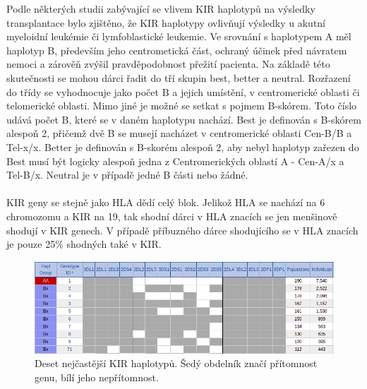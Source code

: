 \documentclass[czech,DP]{thesiskiv}
\numberwithin{equation}{section}
\begin{document}
\noindent
Podle některých studii zabývající se vlivem KIR haplotypů na výsledky transplantace bylo zjištěno, že KIR haplotypy ovlivňují výsledky u akutní myeloidní leukémie či  lymfoblastické leukemie. Ve srovnání s haplotypem A měl haplotyp B, především jeho centrometická část, ochraný účinek před návratem nemoci a zárověň zvýšil pravděpodobnost přežití pacienta. Na základě této skutečnosti se mohou dárci řadit do tří skupin best, better a neutral. Rozřazení do třídy se vyhodnocuje jako počet B a jejich umístění, v centromerické oblasti či telomerické oblasti. Mimo jiné je možné se setkat s pojmem B-skórem. Toto číslo udává počet B, které se v daném haplotypu nachází. Best je definován s B-skórem alespoň 2, přičemž dvě B se musejí nacházet v centromerické oblasti Cen-B/B a Tel-x/x. Better je definován s B-skorém alespoň 2, aby nebyl haplotyp zařezen do Best musí být logicky alespoň jedna z Centromerických oblastí A - Cen-A/x a Tel-B/x. Neutral je v případě jedné B části nebo žádné. \cite{KIR_haplotypy}
\\
\\
KIR geny se stejně jako HLA dědí celý blok. Jelikož HLA se nachází na 6 chromozomu a KIR na 19, tak shodní dárci v HLA znacích se jen menšinově shodují v KIR genech. V případě příbuzného dárce shodujícího se v HLA znacích je pouze 25\% shodných také v KIR. \cite{KIR_haplotypy}

\begin{figure}[H]		
		\centering
		\includegraphics[width=\textwidth]{./img/KIR_haplotypy_priklad.png}
		\caption{Deset nejčastější KIR haplotypů. Šedý obdelník značí přítomnost genu, bílí jeho nepřítomnost. \cite{kir_genotypes_10}}
		\label{fig:kir_haplotypy_10}
\end{figure}
\end{document}

